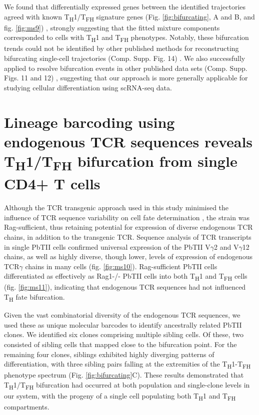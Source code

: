 We found that differentially expressed genes between the identified trajectories agreed with known T\textsubscript{H}1/T\textsubscript{FH} signature genes (Fig. \ref{fig:bifurcating}, A and B, and fig. \ref{fig:ms9}) \cite{Hale2013-yb}, strongly suggesting that the fitted mixture components corresponded to cells with T\textsubscript{H}1 and T\textsubscript{FH} phenotypes. Notably, these bifurcation trends could not be identified by other published methods for reconstructing bifurcating single-cell trajectories (Comp. Supp. Fig. 14) \cite{Marco2014-rf, Trapnell2014-cn, Chen2016-ar, Haghverdi2016-tm, Setty2016-ie}. We also successfully applied  to resolve bifurcation events in other published data sets (Comp. Supp. Figs. 11 and 12) \cite{Treutlein2014-rz, Guo2015-ao}, suggesting that our approach is more generally applicable for studying cellular differentiation using scRNA-seq data.

\section{Lineage barcoding using endogenous TCR sequences reveals \texorpdfstring{T\textsubscript{H}1/T\textsubscript{FH}}{TH1/TFH} bifurcation from single CD4+ T cells}

Although the TCR transgenic approach used in this study minimised the influence of TCR sequence variability on cell fate determination \cite{Tubo2013-zg}, the strain was Rag-sufficient, thus retaining potential for expression of diverse endogenous TCR chains, in addition to the transgenic TCR. Sequence analysis of TCR transcripts in single PbTII cells confirmed universal expression of the PbTII V\( \gamma \)2 and V\( \gamma \)12 chains, as well as highly diverse, though lower, levels of expression of endogenous TCR\( \gamma \) chains in many cells (fig. \ref{fig:ms10}). Rag-sufficient PbTII cells differentiated as effectively as Rag1-/- PbTII cells into both T\textsubscript{H}1 and T\textsubscript{FH} cells (fig. \ref{fig:ms11}), indicating that endogenous TCR sequences had not influenced T\textsubscript{H} fate bifurcation.

Given the vast combinatorial diversity of the endogenous TCR sequences, we used these as unique molecular barcodes to identify ancestrally related PbTII clones. We identified six clones comprising multiple sibling cells. Of these, two consisted of sibling cells that mapped close to the bifurcation point. For the remaining four clones, siblings exhibited highly diverging patterns of differentiation, with three sibling pairs falling at the extremities of the T\textsubscript{H}1-T\textsubscript{FH} phenotype spectrum (Fig. \ref{fig:bifurcating}C). These results demonstrated that T\textsubscript{H}1/T\textsubscript{FH} bifurcation had occurred at both population and single-clone levels in our system, with the progeny of a single cell populating both T\textsubscript{H}1 and T\textsubscript{FH} compartments.

